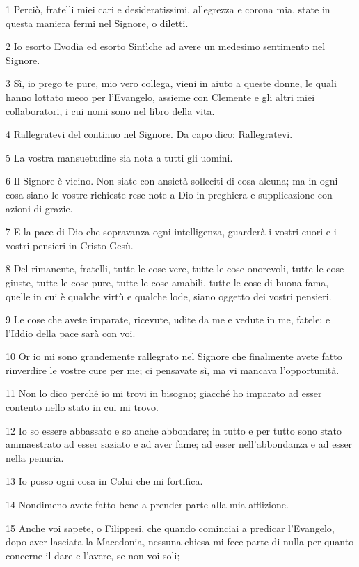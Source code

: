 \par 1 Perciò, fratelli miei cari e desideratissimi, allegrezza e corona mia, state in questa maniera fermi nel Signore, o diletti.
\par 2 Io esorto Evodìa ed esorto Sintìche ad avere un medesimo sentimento nel Signore.
\par 3 Sì, io prego te pure, mio vero collega, vieni in aiuto a queste donne, le quali hanno lottato meco per l'Evangelo, assieme con Clemente e gli altri miei collaboratori, i cui nomi sono nel libro della vita.
\par 4 Rallegratevi del continuo nel Signore. Da capo dico: Rallegratevi.
\par 5 La vostra mansuetudine sia nota a tutti gli uomini.
\par 6 Il Signore è vicino. Non siate con ansietà solleciti di cosa alcuna; ma in ogni cosa siano le vostre richieste rese note a Dio in preghiera e supplicazione con azioni di grazie.
\par 7 E la pace di Dio che sopravanza ogni intelligenza, guarderà i vostri cuori e i vostri pensieri in Cristo Gesù.
\par 8 Del rimanente, fratelli, tutte le cose vere, tutte le cose onorevoli, tutte le cose giuste, tutte le cose pure, tutte le cose amabili, tutte le cose di buona fama, quelle in cui è qualche virtù e qualche lode, siano oggetto dei vostri pensieri.
\par 9 Le cose che avete imparate, ricevute, udite da me e vedute in me, fatele; e l'Iddio della pace sarà con voi.
\par 10 Or io mi sono grandemente rallegrato nel Signore che finalmente avete fatto rinverdire le vostre cure per me; ci pensavate sì, ma vi mancava l'opportunità.
\par 11 Non lo dico perché io mi trovi in bisogno; giacché ho imparato ad esser contento nello stato in cui mi trovo.
\par 12 Io so essere abbassato e so anche abbondare; in tutto e per tutto sono stato ammaestrato ad esser saziato e ad aver fame; ad esser nell'abbondanza e ad esser nella penuria.
\par 13 Io posso ogni cosa in Colui che mi fortifica.
\par 14 Nondimeno avete fatto bene a prender parte alla mia afflizione.
\par 15 Anche voi sapete, o Filippesi, che quando cominciai a predicar l'Evangelo, dopo aver lasciata la Macedonia, nessuna chiesa mi fece parte di nulla per quanto concerne il dare e l'avere, se non voi soli;
